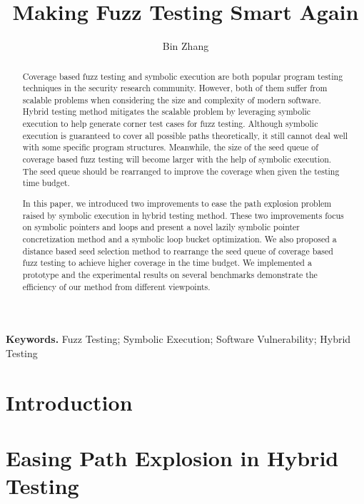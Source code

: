 \documentclass[a4paper]{article}
\begin{document}
\title{Making Fuzz Testing Smart Again}
\author{Bin Zhang}
\maketitle

\begin{abstract}
Coverage based fuzz testing and symbolic execution are both popular program testing techniques in the security research community. However, both of them suffer from scalable problems when considering the size and complexity of modern software. Hybrid testing method mitigates the scalable problem by leveraging symbolic execution to help generate corner test cases for fuzz testing. Although symbolic execution is guaranteed to cover all possible paths theoretically, it still cannot deal well with some specific program structures. Meanwhile, the size of the seed queue of coverage based fuzz testing will become larger with the help of symbolic execution. The seed queue should be rearranged to improve the coverage when given the testing time budget.

In this paper, we introduced two improvements to ease the path explosion problem raised by symbolic execution in hybrid testing method. 
These two improvements focus on symbolic pointers and loops and present a novel lazily symbolic pointer concretization method and a symbolic loop bucket optimization. 
We also proposed a distance based seed selection method to rearrange the seed queue of coverage based fuzz testing to achieve higher coverage in the time budget. We implemented a prototype and the experimental results on several benchmarks demonstrate the efficiency of our method from different viewpoints.
\end{abstract}
\textbf{Keywords.} Fuzz Testing; Symbolic Execution; Software Vulnerability; Hybrid Testing

\section{Introduction} \label{sec:introduction}


\section{Easing Path Explosion in Hybrid Testing} \label{sec:ease PE}

{\color{red}{Why do you speak of Hybrid testing in this part? In the introduction, you mentioned coverage based testing.
 Try to clarify it.}}
\end{document}
